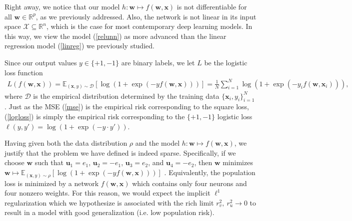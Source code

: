 \documentclass{article}
\begin{document}
Right away, we notice that our model $h: \boldsymbol{w} \mapsto f(\boldsymbol{w}, \boldsymbol{x})$ is not differentiable for all $\boldsymbol{w} \in \mathbb{R}^p$, as we previously addressed. Also, the network is not linear in its input space $\mathcal{X} \subseteq \mathbb{R}^n$, which is the case for most contemporary deep learning models. In this way, we view the model (\ref{relunn}) as more advanced than the linear regression model (\ref{linreg}) we previously studied.

Since our output values $y \in \{+1, -1\}$ are binary labels, we let $L$ be the logistic loss function
\begin{align}\label{logloss}
    L(f(\boldsymbol{w}, \boldsymbol{x})) = \mathbb{E}_{(\boldsymbol{x}, y) \sim \mathcal{D}} \left[\log \left( 1 + \exp(-y f(\boldsymbol{w}, \boldsymbol{x})) \right) \right] = \frac{1}{N} \sum_{i=1}^N \log \left( 1 + \exp(-y_i f(\boldsymbol{w}, \boldsymbol{x}_i)) \right),
\end{align}
where $\mathcal{D}$ is the empirical distribution determined by the training data $\{ \boldsymbol{x}_i, y_i \}_{i=1}^N$. Just as the MSE (\ref{mse}) is the empirical risk corresponding to the square loss, (\ref{logloss}) is simply the empirical risk corresponding to the $\{+1, -1\}$ logistic loss $\ell(y, y') = \log( 1 + \exp(-y \cdot y'))$. 

Having given both the data distribution $\rho$ and the model $h: \boldsymbol{w} \mapsto f(\boldsymbol{w}, \boldsymbol{x})$, we justify that the problem we have defined is indeed sparse. Specifically, if we choose $\boldsymbol{w}$ such that $\boldsymbol{u}_1 = e_1$, $\boldsymbol{u}_2 = -e_1$, $\boldsymbol{u}_3 = e_2$, and $\boldsymbol{u}_4 = -e_2$, then $\boldsymbol{w}$ minimizes $\boldsymbol{w} \mapsto \mathbb{E}_{(\boldsymbol{x}, y) \sim \rho} \left[\log \left( 1 + \exp(-y f(\boldsymbol{w}, \boldsymbol{x})) \right) \right]$ \cite{wei2019regularization}. Equivalently, the population loss is minimized by a network $f(\boldsymbol{w}, \boldsymbol{x})$ which contains only four neurons and four nonzero weights. For this reason, we would expect the implicit $\ell^1$ regularization which we hypothesize is associated with the rich limit $r_v^2, \ r_u^2 \rightarrow 0$ to result in a model with good generalization (i.e. low population risk).
\end{document}
